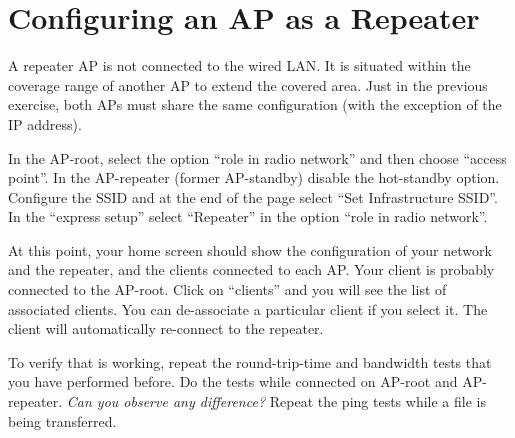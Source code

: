 \section{Configuring an AP as a Repeater}

A repeater AP is not connected to the wired LAN.
It is situated within the coverage range of another AP to extend the covered area.
Just in the previous exercise, both APs must share the same configuration (with the exception of the IP address).

In the AP-root, select the option ``role in radio network'' and then choose ``access point''.
In the AP-repeater (former AP-standby) disable the hot-standby option.
Configure the SSID and at the end of the page select ``Set Infrastructure SSID''.
In the ``express setup'' select ``Repeater'' in the option ``role in radio network''.

At this point, your home screen should show the configuration of your network and the repeater, and the clients connected to each AP.
Your client is probably connected to the AP-root.
Click on ``clients'' and you will see the list of associated clients.
You can de-associate a particular client if you select it.
The client will automatically re-connect to the repeater.

To verify that is working, repeat the round-trip-time and bandwidth tests that you have performed before.
Do the tests while connected on AP-root and AP-repeater.
\emph{Can you observe any difference?}
Repeat the ping tests while a file is being transferred.





